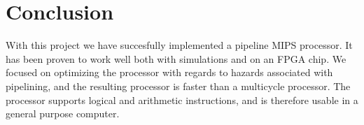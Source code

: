 \section{Conclusion}

With this project we have succesfully implemented a pipeline MIPS processor. It has been proven to work well both with simulations and on an FPGA chip. We focused on optimizing the processor with regards to hazards associated with pipelining, and the resulting processor is faster than a multicycle processor. The processor supports logical and arithmetic instructions, and is therefore usable in a general purpose computer. 
